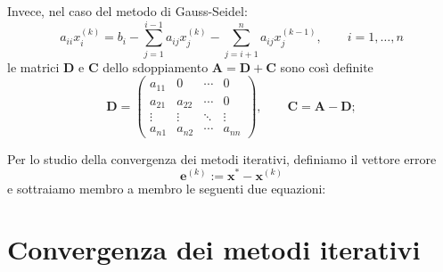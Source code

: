 Invece, nel caso del metodo di Gauss-Seidel:
\[a_{ii}x_i^{(k)}=b_i-\sum_{j=1}^{i-1}{a_{ij}x_j^{(k)}}-\sum_{j=i+1}^{n}{a_{ij}x_j^{(k-1)}},\qquad i=1,\dots,n\]
le matrici $\mathbf{D}$ e $\mathbf{C}$ dello sdoppiamento $\mathbf{A}=\mathbf{D}+\mathbf{C}$ sono così definite
\[\mathbf{D}=\left(
    \begin{matrix}
        a_{11} & 0 & \cdots & 0 \\
        a_{21} & a_{22} & \cdots & 0 \\
        \vdots & \vdots & \ddots & \vdots \\
        a_{n1} & a_{n2} & \cdots & a_{nn}
    \end{matrix}
\right),\qquad\mathbf{C}=\mathbf{A}-\mathbf{D};\]

Per lo studio della convergenza dei metodi iterativi, definiamo il vettore errore
\[\mathbf{e}^{(k)}:=\mathbf{x}^*-\mathbf{x}^{(k)}\]
e sottraiamo membro a membro le seguenti due equazioni:

\section{Convergenza dei metodi iterativi}
